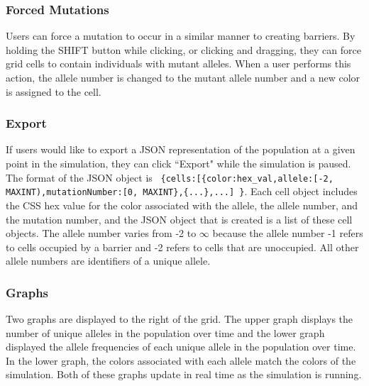 \documentclass[12pt]{article}
\begin{document}
\begin{spacing}{1.6}
\subsubsection{Forced Mutations}
Users can force a mutation to occur in a similar manner to creating barriers. By holding the SHIFT button while clicking, or clicking and dragging, they can force grid cells to contain individuals with mutant alleles. When a user performs this action, the allele number is changed to the mutant allele number and a new color is assigned to the cell.

\subsubsection{Export}
If users would like to export a JSON representation of the population at a given point in the simulation, they can click ``Export" while the simulation is paused. The format of the JSON object is \ \texttt{\{cells:[\{color:hex\_val,allele:[-2, MAXINT),mutationNumber:[0, MAXINT\},\{...\},...] \}}. Each cell object includes the CSS hex value for the color associated with the allele, the allele number, and the mutation number, and the JSON object that is created is a list of these cell objects. The allele number varies from -2 to $\infty$ because the allele number -1 refers to cells occupied by a barrier and -2 refers to cells that are unoccupied. All other allele numbers are identifiers of a unique allele.

\subsubsection{Graphs}
Two graphs are displayed to the right of the grid. The upper graph displays the number of unique alleles in the population over time and the lower graph displayed the allele frequencies of each unique allele in the population over time. In the lower graph, the colors associated with each allele match the colors of the simulation. Both of these graphs update in real time as the simulation is running.


\end{spacing}
\end{document}
